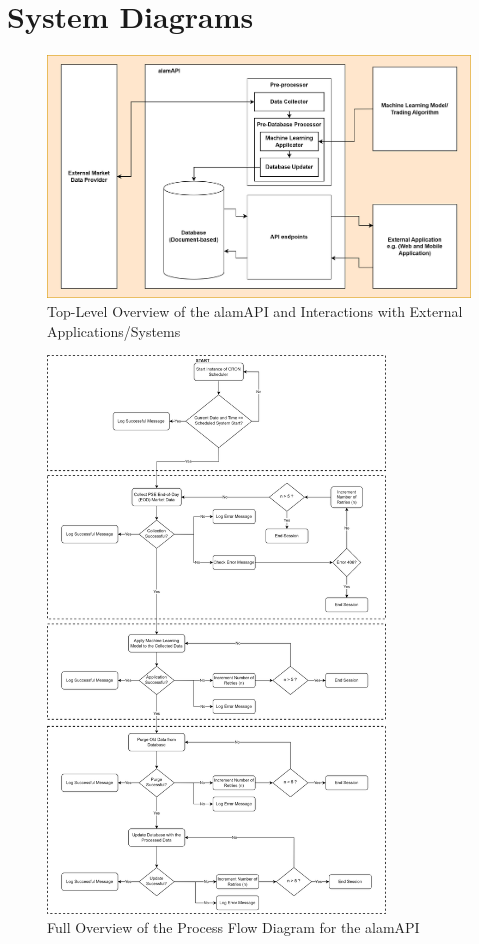 \section{System Diagrams}
\label{sec:system_diagrams}

\begin{figure}
    \centering
    \includegraphics[width=1\textwidth]{./assets/SystemOverview.png}
    \caption{Top-Level Overview of the alamAPI and Interactions with External Applications/Systems}
    \label{fig:system_overview}
\end{figure}

\begin{figure}
    \centering
    \includegraphics[width=0.8\textwidth]{./assets/ProcessFlowchart.png}
    \caption{Full Overview of the Process Flow Diagram for the alamAPI}
    \label{fig:process_flowchart}
\end{figure}


